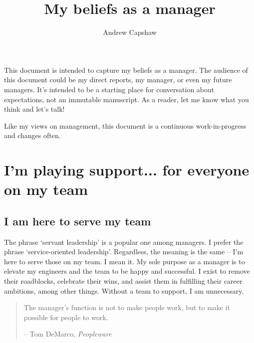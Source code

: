 \documentclass[11pt]{amsart}
\title{My beliefs as a manager}
\author{Andrew Capshaw}
\begin{document}
\thispagestyle{empty}



\maketitle

This document is intended to capture my beliefs as a manager. The audience of this document could be my direct reports, my manager, or even my future managers. It's intended to be a starting place for conversation about expectations, not an immutable manuscript. As a reader, let me know what you think and let's talk! 

Like my views on management, this document is a continuous work-in-progress and changes often.

\section*{I'm playing support... for everyone on my team} %
\subsection*{I am here to serve my team}
The phrase `servant leadership’ is a popular one among managers. I prefer the phrase `service-oriented leadership'. Regardless, the meaning is the same -- I'm here to serve those on my team. I mean it. My sole purpose as a manager is to elevate my engineers and the team to be happy and successful. I exist to remove their roadblocks, celebrate their wins, and assist them in fulfilling their career ambitions, among other things. Without a team to support, I am unnecessary.

\begin{quote}
The manager’s function is not to make people work, but to make it possible for people to work.

-- Tom DeMarco, \emph{Peopleware}
\end{quote}
\end{document}
